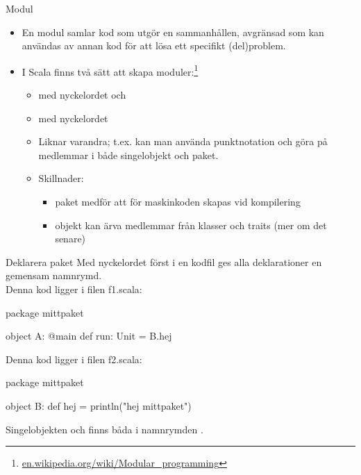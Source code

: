 \begin{Slide}{Modul}

  \begin{itemize}
    \item En modul samlar kod som utgör en sammanhållen, avgränsad  som kan användas av annan kod  för att lösa ett specifikt (del)problem.
    \item I Scala finns två sätt att skapa moduler:\footnote{\href{https://en.wikipedia.org/wiki/Modular_programming}{en.wikipedia.org/wiki/Modular\_programming}}
    \begin{itemize}
      \item {} med nyckelordet  och
      \item {} med nyckelordet 
      \pause
      \item Liknar varandra; t.ex. kan man använda punktnotation och göra  på medlemmar i både singelobjekt och paket.
      \pause
      \item Skillnader:
      \begin{itemize} 
        \item paket medför att  för maskinkoden skapas vid kompilering
        \item objekt kan ärva medlemmar från klasser och traits (mer om det senare)
      \end{itemize}
    \end{itemize}
  
  \end{itemize}
\end{Slide}

\begin{Slide}{Deklarera paket}
Med nyckelordet  först i en kodfil ges alla deklarationer en gemensam namnrymd.\\
\vspace{1em}
Denna kod ligger i filen f1.scala:
\begin{Code}
package mittpaket

object A: 
  @main def run: Unit = B.hej
\end{Code}

Denna kod ligger i filen f2.scala:
\begin{Code}
package mittpaket

object B:
  def hej = println("hej mittpaket")
\end{Code}
Singelobjekten  och  finns båda i namnrymden .
\end{Slide}

